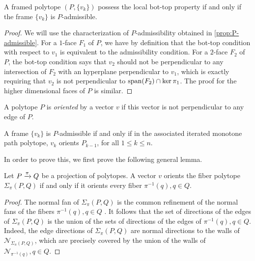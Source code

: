 \begin{lemma}
	\label{l:bot-top-admissible}
	A framed polytope $(P,\{v_k\})$ possess the local bot-top property if and only if the frame $\{v_k\}$ is $P$-admissible.
\end{lemma}

\begin{proof}
	We will use the characterization of $P$-admissibility obtained in \cref{prop:P-admissible}.
	For a $1$-face $F_1$ of $P$, we have by definition that the bot-top condition with respect to $v_1$ is equivalent to the admissibility condition. 
	For a $2$-face $F_2$ of $P$, the bot-top condition says that $v_2$ should not be perpendicular to any intersection of $F_2$  with an hyperplane perpendicular to $v_1$, which is exactly requiring that $v_2$ is not perpendicular to $\operatorname{\mathrm{span}}(F_2)\cap \ker \pi_1$.
	The proof for the higher dimensional faces of $P$ is similar. 
\end{proof}

\begin{definition}
	A polytope $P$ is \emph{oriented} by a vector $v$ if this vector is not perpendicular to any edge of $P$. 
\end{definition}

\begin{proposition}
	\label{prop:KV-BS}
	A frame $\{v_k\}$ is $P$-admissible if and only if in the associated iterated monotone path polytope, $v_k$ orients $P_{k-1}$, for all $1\leq k \leq n$.
\end{proposition}

In order to prove this, we first prove the following general lemma.

\begin{lemma} \label{lemma:orients-the-fibers}
	Let $P \xrightarrow{\pi} Q$ be a projection of polytopes.
	A vector $v$ orients the fiber polytope $\Sigma_\pi(P,Q)$ if and only if it orients every fiber $\pi^{-1}(q), q \in Q$.
\end{lemma}

\begin{proof}
	The normal fan of $\Sigma_\pi(P,Q)$ is the common refinement of the normal fans of the fibers $\pi^{-1}(q), q \in Q$ \cite[Proposition 2.2]{BilleraSturmfels94}.
	It follows that the set of directions of the edges of $\Sigma_\pi(P,Q)$ is the union of the sets of directions of the edges of $\pi^{-1}(q), q \in Q$.
	Indeed, the edge directions of $\Sigma_\pi(P,Q)$ are normal directions to the walls of $\mathcal{N}_{\Sigma_\pi(P,Q)}$, which are precisely covered by the union of the walls of $\mathcal{N}_{\pi^{-1}(q)}, q \in Q$.
\end{proof}

